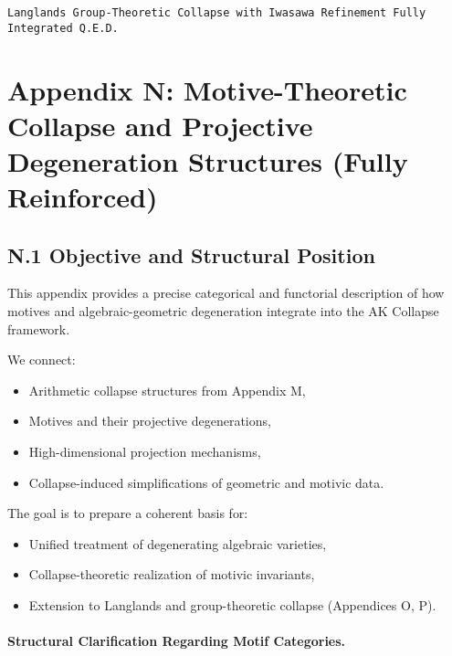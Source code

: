 \documentclass[11pt]{article}
\begin{document}
\begin{flushright}
\texttt{Langlands Group-Theoretic Collapse with Iwasawa Refinement \quad Fully Integrated \quad Q.E.D.}
\end{flushright}





\section*{Appendix N: Motive-Theoretic Collapse and Projective Degeneration Structures (Fully Reinforced)}

\subsection*{N.1 Objective and Structural Position}

This appendix provides a precise categorical and functorial description of how motives and algebraic-geometric degeneration integrate into the AK Collapse framework.  

We connect:
\begin{itemize}
  \item Arithmetic collapse structures from Appendix M,
  \item Motives and their projective degenerations,
  \item High-dimensional projection mechanisms,
  \item Collapse-induced simplifications of geometric and motivic data.
\end{itemize}

The goal is to prepare a coherent basis for:
\begin{itemize}
  \item Unified treatment of degenerating algebraic varieties,
  \item Collapse-theoretic realization of motivic invariants,
  \item Extension to Langlands and group-theoretic collapse (Appendices O, P).
\end{itemize}

\paragraph{Structural Clarification Regarding Motif Categories.}
\end{document}
